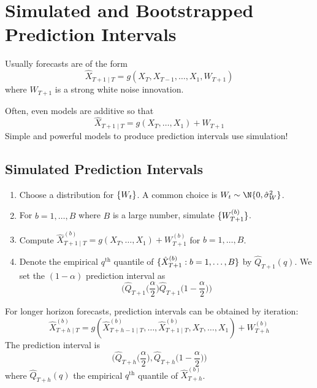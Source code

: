 \section{Simulated and Bootstrapped Prediction Intervals}
Usually forecasts are of the form
\[ \hat{X}_{T+1\mid T}=g(X_T,X_{T-1},\ldots,X_1,W_{T+1}) \]
where $ W_{T+1} $ is a strong white noise innovation.

Often, even models are additive so that
\[ \hat{X}_{T+1\mid T}=g(X_T,\ldots,X_1)+W_{T+1} \]
Simple and powerful models to produce prediction intervals
use simulation!
\subsection*{Simulated Prediction Intervals}
\begin{enumerate}[(1)]
      \item Choose a distribution for $ \{W_t\} $. A common choice is $ W_t \sim \N{0,\hat{\sigma}_W^2} $.
      \item For $ b=1,\ldots,B $ where $ B $ is a large number, simulate $ \{W_{T+1}^{(b)}\} $.
      \item Compute $ \hat{X}_{T+1\mid T}^{(b)}=g(X_{T},\ldots,X_1)+W_{T+1}^{(b)} $
            for $ b=1,\ldots,B $.
      \item Denote the empirical $ q^{\text{th}} $ quantile of $ \{\hat{X}_{T+1}^{(b)}:b=1,\ldots,B\} $
            by $ \hat{Q}_{T+1}(q) $. We set the $ (1-\alpha) $ prediction interval as
            \[ \biggl(\hat{Q}_{T+1}\biggl(\frac{\alpha}{2} \biggr)\hat{Q}_{T+1}\biggl(1-\frac{\alpha}{2} \biggr)\biggr) \]
\end{enumerate}
\begin{Remark}{}{}
      For longer horizon forecasts, prediction intervals can be obtained by iteration:
      \[ \hat{X}_{T+h\mid T}^{(b)}=g(\hat{X}_{T+h-1\mid T}^{(b)},\ldots,\hat{X}_{T+1\mid T}^{(b)},X_T,\ldots,X_1)+W_{T+h}^{(b)} \]
      The prediction interval is
      \[ \biggl(\hat{Q}_{T+h}\biggl(\frac{\alpha}{2} \biggr),\hat{Q}_{T+h}\biggl(1-\frac{\alpha}{2} \biggr)\biggr) \]
      where $ \hat{Q}_{T+h}(q) $ the empirical $ q^{\text{th}} $ quantile of $ \hat{X}_{T+h}^{(b)} $.
\end{Remark}
